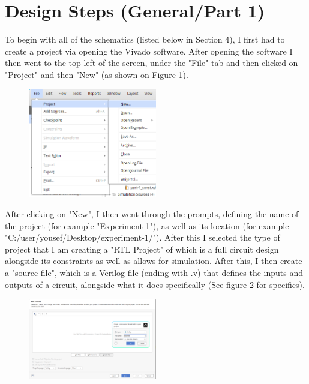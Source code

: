 \documentclass{article}
\begin{document}
\section{Design Steps (General/Part 1)}
\qquad
To begin with all of the schematics (listed below in Section 4), I first had to create a project via opening the Vivado software. After opening the software I then went to the top left of the screen, under the "File" tab and then clicked on "Project" and then "New" (as shown on Figure 1).\\
\begin{figure}[!htbp]
    \centering
    \caption{}
    \includegraphics[width=0.5\textwidth]{figure_3_1.png}
    \label{Figure 3.1}
\end{figure}\newline
After clicking on "New", I then went through the prompts, defining the name of the project (for example "Experiment-1"), as well as its location (for example "C:/user/yousef/Desktop/experiment-1/"). After this I selected the type of project that I am creating a "RTL Project" of which is a full circuit design alongside its constraints as well as allows for simulation. After this, I then create a "source file", which is a Verilog file (ending with .v) that defines the inputs and outputs of a circuit, alongside what it does specifically (See figure 2 for specifics).\\
\begin{figure}[!htbp]
    \centering
    \caption{}
    \includegraphics[width=0.5\textwidth]{figure_3_2.png}
    \label{Figure 3.2}
\end{figure}\newline
\end{document}
